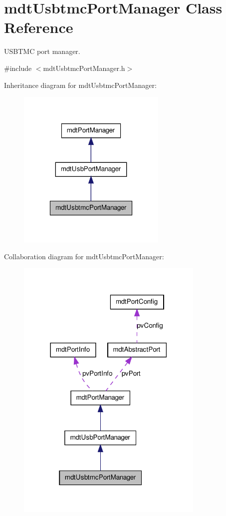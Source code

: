 \hypertarget{classmdt_usbtmc_port_manager}{
\section{mdtUsbtmcPortManager Class Reference}
\label{classmdt_usbtmc_port_manager}
}


USBTMC port manager.  




{\ttfamily \#include $<$mdtUsbtmcPortManager.h$>$}



Inheritance diagram for mdtUsbtmcPortManager:
\nopagebreak
\begin{figure}[H]
\begin{center}
\leavevmode
\includegraphics[width=202pt]{classmdt_usbtmc_port_manager__inherit__graph}
\end{center}
\end{figure}


Collaboration diagram for mdtUsbtmcPortManager:
\nopagebreak
\begin{figure}[H]
\begin{center}
\leavevmode
\includegraphics[width=254pt]{classmdt_usbtmc_port_manager__coll__graph}
\end{center}
\end{figure}
